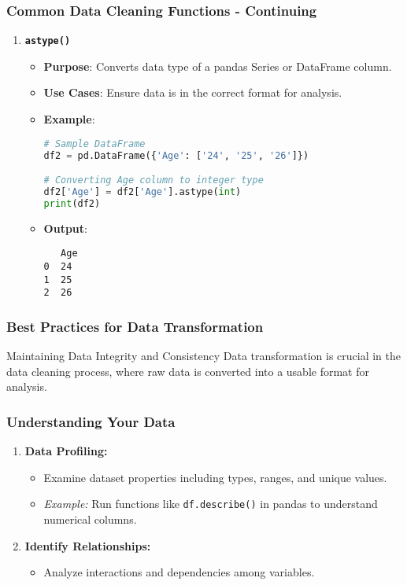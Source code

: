 \documentclass[aspectratio=169]{beamer}
\begin{document}
\begin{frame}[fragile]
    \frametitle{Common Data Cleaning Functions - Continuing}
    \begin{enumerate}[resume]
        \item \textbf{\texttt{astype()}}  
            \begin{itemize}
                \item \textbf{Purpose}: Converts data type of a pandas Series or DataFrame column.
                \item \textbf{Use Cases}: Ensure data is in the correct format for analysis.
                \item \textbf{Example}:
                \begin{lstlisting}[language=Python]
# Sample DataFrame
df2 = pd.DataFrame({'Age': ['24', '25', '26']})

# Converting Age column to integer type
df2['Age'] = df2['Age'].astype(int)
print(df2)
                \end{lstlisting}
                \item \textbf{Output}:
                \begin{lstlisting}
   Age
0  24
1  25
2  26
                \end{lstlisting}
            \end{itemize}
    \end{enumerate}
\end{frame}

\begin{frame}[fragile]
    \frametitle{Best Practices for Data Transformation}
    \begin{block}{Maintaining Data Integrity and Consistency}
      Data transformation is crucial in the data cleaning process, where raw data is converted into a usable format for analysis. 
    \end{block}
\end{frame}

\begin{frame}[fragile]
    \frametitle{Understanding Your Data}
    \begin{enumerate}
        \item \textbf{Data Profiling:}
        \begin{itemize}
            \item Examine dataset properties including types, ranges, and unique values.
            \item \textit{Example:} Run functions like \texttt{df.describe()} in pandas to understand numerical columns.
        \end{itemize}
        
        \item \textbf{Identify Relationships:}
        \begin{itemize}
            \item Analyze interactions and dependencies among variables.
        \end{itemize}
    \end{enumerate}
\end{frame}
\end{document}
